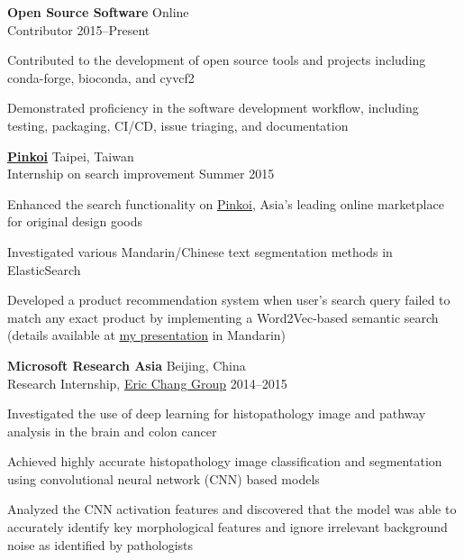\begin{entrylist}
\item \textbf{Open Source Software} \hfill Online\\
Contributor \hfill 2015--Present
\begin{detaillist}
    \item Contributed to the development of open source tools and projects including conda-forge, bioconda, and cyvcf2
    \item Demonstrated proficiency in the software development workflow, including testing, packaging, CI/CD, issue triaging, and documentation
\end{detaillist}

\item \href{http://pinkoi.com}{\textbf{Pinkoi}} \hfill Taipei, Taiwan\\
Internship on search improvement \hfill
Summer 2015
\begin{detaillist}
    \item Enhanced the search functionality on \href{http://pinkoi.com}{Pinkoi}, Asia's leading online marketplace for original design goods
    \item Investigated various Mandarin/Chinese text segmentation methods in ElasticSearch
    \item Developed a product recommendation system when user's search query failed to match any exact product by implementing a Word2Vec-based semantic search (details available at \href{https://blog.liang2.tw/2015Talk-Chinese-Search/}{my presentation} in Mandarin)
\end{detaillist}

\item \textbf{Microsoft Research Asia} \hfill Beijing, China\\
Research Internship, \href{https://www.microsoft.com/en-us/research/people/echang/}{Eric Chang Group} \hfill
2014--2015
\begin{detaillist}
    \item Investigated the use of deep learning for histopathology image and pathway analysis in the brain and colon cancer
    \item Achieved highly accurate histopathology image classification and segmentation using convolutional neural network (CNN) based models
    \item Analyzed the CNN activation features and discovered that the model was able to
    accurately identify key morphological features and ignore irrelevant background noise as identified by pathologists
\end{detaillist}


\end{entrylist}
